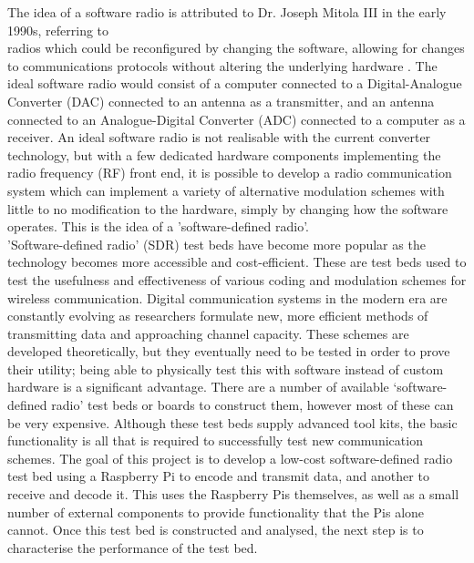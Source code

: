 \documentclass[../main.tex]{subfiles}
\begin{document}
The idea of a software radio is attributed to Dr. Joseph Mitola III in the early 1990s, referring to\\radios which could be reconfigured by changing the software, allowing for changes to communications protocols without altering the underlying hardware \cite{pap_Mitola}.
The ideal software radio would consist of a computer connected to a Digital-Analogue Converter (DAC) connected to an antenna as a transmitter, and an antenna connected to an Analogue-Digital Converter (ADC) connected to a computer as a receiver.
An ideal software radio is not realisable with the current converter technology, but with a few dedicated hardware components implementing the radio frequency (RF) front end, it is possible to develop a radio communication system which can implement a variety of alternative modulation schemes with little to no modification to the hardware, simply by changing how the software operates.
This is the idea of a 'software-defined radio'.\\

'Software-defined radio' (SDR) test beds have become more popular as the technology becomes more accessible and cost-efficient.
These are test beds used to test the usefulness and effectiveness of various coding and modulation schemes for wireless communication.
Digital communication systems in the modern era are constantly evolving as researchers formulate new, more efficient methods of transmitting data and approaching channel capacity.
These schemes are developed theoretically, but they eventually need to be tested in order to prove their utility; being able to physically test this with software instead of custom hardware is a significant advantage.
There are a number of available ‘software-defined radio’ test beds or boards to construct them, however most of these can be very expensive.
Although these test beds supply advanced tool kits, the basic functionality is all that is required to successfully test new communication schemes.
The goal of this project is to develop a low-cost software-defined radio test bed using a Raspberry Pi to encode and transmit data, and another to receive and decode it.
This uses the Raspberry Pis themselves, as well as a small number of external components to provide functionality that the Pis alone cannot.
Once this test bed is constructed and analysed, the next step is to characterise the performance of the test bed.\\

\end{document}
